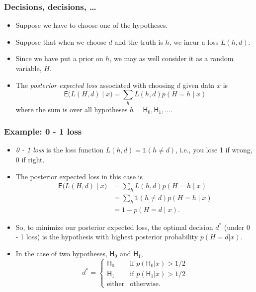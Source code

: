 \documentclass[handout]{beamer}
\def\H{\textsf{H}}
\def\E{\textsf{E}}
\def\I{\mathbb{1}}
\newcommand{\branchthree}[6]{
\left\{
	\begin{array}{ll}
		#1  & \mbox{if } #2 \\
		#3 & \mbox{if } #4 \\
		#5 & #6
	\end{array}
\right.
}
\begin{document}
\begin{frame}
\frametitle{Decisions, decisions, \dots}
\begin{itemize}
\item Suppose we have to choose one of the hypotheses.
\item Suppose that when we choose $d$ and the truth is $h$, we incur a loss $L(h,d)$.
\item Since we have put a prior on $h$, we may as well consider it as a random variable, $H$.
\item The \emph{posterior expected loss} associated with choosing $d$ given data $x$ is
$$\E\big(L(H,d)\mid x\big) = \sum_h L(h,d) p(H=h\mid x) $$
where the sum is over all hypotheses $h =\H_0,\H_1,\dotsc$.
\end{itemize}
\end{frame}


\begin{frame}
\frametitle{Example: 0 - 1 loss}
\begin{itemize}
\item \emph{0 - 1 loss} is the loss function $L(h,d) =\I(h \neq d)$, i.e., you lose 1 if wrong, 0 if right.
\item The posterior expected loss in this case is
\begin{align*}
\E\big(L(H,d)\mid x\big) &= \sum_h L(h,d) p(H=h\mid x) \\
&= \sum_h \I(h \neq d) p(H=h\mid x) \\
&= 1 - p(H=d\mid x).
\end{align*}
\item So, to minimize our posterior expected loss, the optimal decision $d^*$ (under 0 - 1 loss) is the hypothesis with highest posterior probability $p(H = d|x)$.
\item In the case of two hypotheses, $\H_0$ and $\H_1$,
$$ d^* = \branchthree{\H_0}{p(\H_0|x)>1/2}{\H_1}{p(\H_1|x)>1/2}{\mbox{either}}{\mbox{otherwise.}} $$
\end{itemize}
\end{frame}
\end{document}
